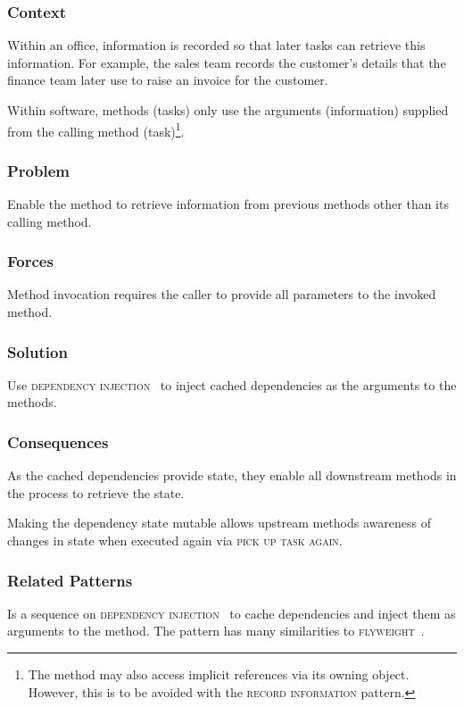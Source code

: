 \documentclass[prodmode]{style/acmlarge}
\begin{document}
\subsubsection*{Context} Within an office, information is recorded so that later
tasks can retrieve this information.  For example, the sales team records the
customer's details that the finance team later use to raise an invoice for the
customer.

Within software, methods (tasks) only use the arguments (information) supplied
from the calling method (task)\footnote{The method may also access implicit
references via its owning object.  However, this is to be avoided with the
\textsc{record information} pattern.}.

\subsubsection*{\textbf{Problem}} Enable the method to retrieve information from previous
methods other than its calling method.

\subsubsection*{Forces} Method invocation requires the caller to provide all
parameters to the invoked method.

\subsubsection*{\textbf{Solution}} Use \textsc{dependency injection}~\cite{ioc} to inject
cached dependencies as the arguments to the methods.

\subsubsection*{Consequences} As the cached dependencies provide state, they
enable all downstream methods in the process to retrieve the state.

Making the dependency state mutable allows upstream methods awareness of changes
in state when executed again via \textsc{pick up task again}.

\subsubsection*{Related Patterns} Is a sequence on \textsc{dependency
injection}~\cite{ioc} to cache dependencies and inject them as arguments to the
method.  The pattern has many similarities to \textsc{flyweight}~\cite{gof}.
\end{document}
